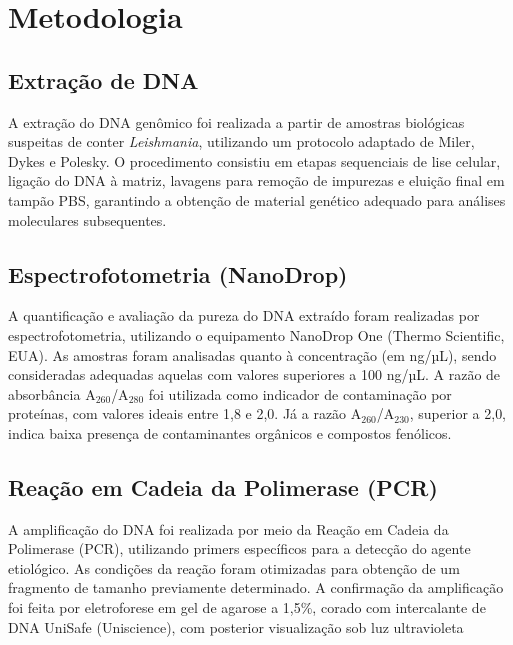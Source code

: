 \section{Metodologia}

\subsection{Extração de DNA}

A extração do DNA genômico foi realizada a partir de amostras biológicas
suspeitas de conter \textit{Leishmania}, utilizando um protocolo adaptado de
Miler, Dykes e Polesky\cite{SODEmiller1988}.  O procedimento consistiu em
etapas sequenciais de lise celular, ligação do DNA à matriz, lavagens para
remoção de impurezas e eluição final em tampão PBS, garantindo a obtenção de
material genético adequado para análises moleculares subsequentes.

\subsection{Espectrofotometria (NanoDrop)}

A quantificação e avaliação da pureza do DNA extraído foram realizadas por
espectrofotometria, utilizando o equipamento NanoDrop One (Thermo Scientific,
EUA). As amostras foram analisadas quanto à concentração (em ng/µL), sendo
consideradas adequadas aquelas com valores superiores a 100 ng/µL. A razão de
absorbância A$_{260}$/A$_{280}$ foi utilizada como indicador de contaminação por
proteínas, com valores ideais entre 1{,}8 e 2{,}0. Já a razão
A$_{260}$/A$_{230}$, superior a 2{,}0, indica baixa presença de contaminantes
orgânicos e compostos fenólicos.

\subsection{Reação em Cadeia da Polimerase (PCR)}

A amplificação do DNA foi realizada por meio da Reação em Cadeia da Polimerase
(PCR), utilizando primers específicos para a detecção do agente etiológico. As
condições da reação foram otimizadas para obtenção de um fragmento de tamanho
previamente determinado. A confirmação da amplificação foi feita por
eletroforese em gel de agarose a 1,5\%, corado com intercalante de DNA UniSafe
(Uniscience), com posterior visualização sob luz ultravioleta

